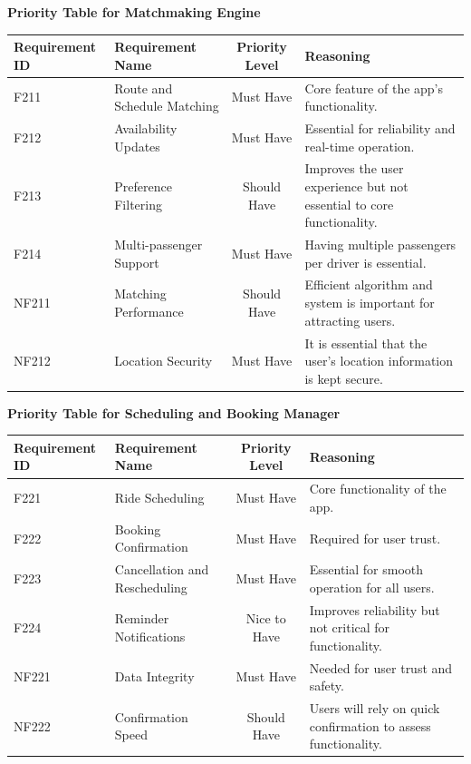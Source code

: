 \documentclass[12pt,letterpaper]{article}
\begin{document}
\noindent \textbf{Priority Table for Matchmaking Engine}
\vspace{0.5em}
\begin{center}
\small
\begin{tabularx}{\textwidth}{|l|X|c|Y|}
\hline
\textbf{Requirement ID} & \textbf{Requirement Name} & \textbf{Priority Level} & \textbf{Reasoning} \\ \hline
F211 & Route and Schedule Matching & Must Have & Core feature of the app’s functionality. \\ \hline
F212 & Availability Updates & Must Have & Essential for reliability and real-time operation. \\ \hline
F213 & Preference Filtering & Should Have & Improves the user experience but not essential to core functionality. \\ \hline
F214 & Multi-passenger Support & Must Have & Having multiple passengers per driver is essential. \\ \hline
NF211 & Matching Performance & Should Have & Efficient algorithm and system is important for attracting users. \\ \hline
NF212 & Location Security & Must Have & It is essential that the user’s location information is kept secure. \\ \hline
\end{tabularx}
\end{center}
\vspace{2em}

\noindent \textbf{Priority Table for Scheduling and Booking Manager}
\vspace{0.5em}
  \begin{center}
  \small
  \begin{tabularx}{\textwidth}{|l|X|c|Y|}
  \hline
  \textbf{Requirement ID} & \textbf{Requirement Name} & \textbf{Priority Level} & \textbf{Reasoning} \\ \hline
  F221 & Ride Scheduling & Must Have & Core functionality of the app. \\ \hline
  F222 & Booking Confirmation & Must Have & Required for user trust. \\ \hline
  F223 & Cancellation and Rescheduling & Must Have & Essential for smooth operation for all users. \\ \hline
  F224 & Reminder Notifications & Nice to Have & Improves reliability but not critical for functionality. \\ \hline
  NF221 & Data Integrity & Must Have & Needed for user trust and safety. \\ \hline
  NF222 & Confirmation Speed & Should Have & Users will rely on quick confirmation to assess functionality. \\ \hline
  \end{tabularx}
\end{center}
  \vspace{2em}
\end{document}
